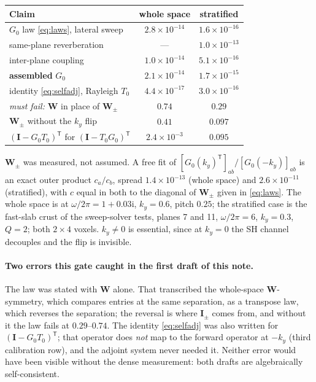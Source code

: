 \documentclass[11pt,a4paper]{article}
\newcommand{\ii}{\mathrm{i}}
\newcommand{\Tz}{T_0}
\newcommand{\Gz}{G_0}
\newcommand{\bW}{\mathbf{W}}
\newcommand{\bI}{\mathbf{I}}
\newcommand{\T}{\mathsf{T}}
\begin{document}
\begin{center}
\small
\setlength{\tabcolsep}{4pt}\begin{tabular}{@{}lcc@{}}
\toprule
Claim & whole space & stratified \\
\midrule
$\Gz$ law \eqref{eq:laws}, lateral sweep & $2.8\times10^{-14}$ & $1.6\times10^{-16}$ \\
\quad same-plane reverberation & --- & $1.0\times10^{-13}$ \\
\quad inter-plane coupling & $1.0\times10^{-14}$ & $5.1\times10^{-16}$ \\
\quad \textbf{assembled} $\Gz$ & $2.1\times10^{-14}$ & $1.7\times10^{-15}$ \\
identity \eqref{eq:selfadj}, Rayleigh $\Tz$ & $4.4\times10^{-17}$ & $3.0\times10^{-16}$ \\
\midrule
\emph{must fail:} $\bW$ in place of $\mathbf{W}_{\pm}$ & $0.74$ & $0.29$ \\
\quad $\mathbf{W}_{\pm}$ without the $k_y$ flip & $0.41$ & $0.097$ \\
\quad $(\bI-\Gz\Tz)^{\T}$ for $(\bI-\Tz\Gz)^{\T}$ & $2.4\times10^{-3}$ & $0.095$ \\
\bottomrule
\end{tabular}
\end{center}

$\mathbf{W}_{\pm}$ was measured, not assumed. A free fit of
$[\Gz(k_y)^{\T}]_{ab}/[\Gz(-k_y)]_{ab}$ is an exact outer product $c_a/c_b$, spread
$1.4\times10^{-13}$ (whole space) and $2.6\times10^{-11}$ (stratified), with $c$ equal in both to the diagonal of $\mathbf{W}_{\pm}$ given in \eqref{eq:laws}. The whole space is at
$\omega/2\pi = 1+0.03\ii$, $k_y = 0.6$, pitch $0.25$; the stratified case is the fast-slab crust of
the sweep-solver tests, planes 7 and 11, $\omega/2\pi = 6$, $k_y=0.3$, $Q=2$; both $2\times4$
voxels. $k_y\neq0$ is essential, since at $k_y=0$ the SH channel decouples and the flip is
invisible.

\paragraph{Two errors this gate caught in the first draft of this note.} The law was stated with
$\bW$ alone. That transcribed the whole-space $\bW$-symmetry, which compares entries at the same
separation, as a transpose law, which reverses the separation; the reversal is where $\mathbf{I}_{\pm}$
comes from, and without it the law fails at $0.29$--$0.74$. The identity \eqref{eq:selfadj} was
also written for $(\bI-\Gz\Tz)^{\T}$; that operator does \emph{not} map to the forward operator
at $-k_y$ (third calibration row), and the adjoint system never needed it. Neither error would
have been visible without the dense measurement: both drafts are algebraically self-consistent.
\end{document}
